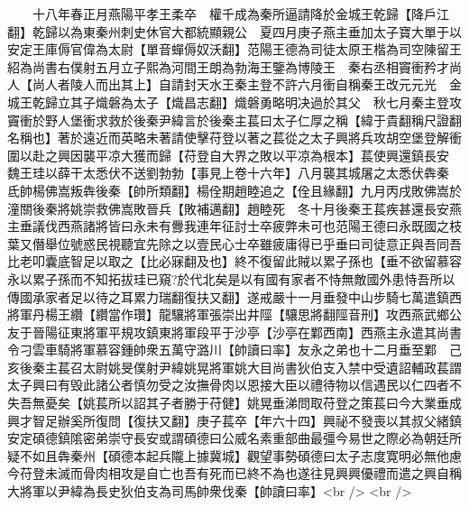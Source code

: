 　　十八年春正月燕陽平孝王柔卒　權千成為秦所逼請降於金城王乾歸【降戶江翻】乾歸以為東秦州刺史休官大都統顯親公　夏四月庚子燕主垂加太子寶大單于以安定王庫傉官偉為太尉【單音蟬傉奴沃翻】范陽王德為司徒太原王楷為司空陳留王紹為尚書右僕射五月立子熙為河間王朗為勃海王鑒為博陵王　秦右丞相竇衝矜才尚人【尚人者陵人而出其上】自請封天水王秦主登不許六月衝自稱秦王改元元光　金城王乾歸立其子熾磐為太子【熾昌志翻】熾磐勇略明决過於其父　秋七月秦主登攻竇衝於野人堡衝求救於後秦尹緯言於後秦主萇曰太子仁厚之稱【緯于貴翻稱尺證翻名稱也】著於遠近而英略未著請使擊苻登以著之萇從之太子興將兵攻胡空堡登解衝圍以赴之興因襲平凉大獲而歸【苻登自大界之敗以平凉為根本】萇使興還鎮長安　魏王珪以薛干太悉伏不送劉勃勃【事見上卷十六年】八月襲其城屠之太悉伏犇秦　氐帥楊佛嵩叛犇後秦【帥所類翻】楊佺期趙睦追之【佺且緣翻】九月丙戌敗佛嵩於潼關後秦將姚崇救佛嵩敗晉兵【敗補邁翻】趙睦死　冬十月後秦王萇疾甚還長安燕主垂議伐西燕諸將皆曰永未有釁我連年征討士卒疲弊未可也范陽王德曰永既國之枝葉又僭舉位號惑民視聽宜先除之以壹民心士卒雖疲庸得已乎垂曰司徒意正與吾同吾比老叩囊底智足以取之【比必寐翻及也】終不復留此賊以累子孫也【垂不欲留慕容永以累子孫而不知拓拔珪已窺?於代北矣是以有國有家者不恃無敵國外患恃吾所以傳國承家者足以待之耳累力瑞翻復扶又翻】遂戒嚴十一月垂發中山步騎七萬遣鎮西將軍丹楊王纘【纘當作瓚】龍驤將軍張崇出井陘【驤思將翻陘音刑】攻西燕武鄉公友于晉陽征東將軍平規攻鎮東將軍段平于沙亭【沙亭在鄴西南】西燕主永遣其尚書令刁雲車騎將軍慕容鍾帥衆五萬守潞川【帥讀曰率】友永之弟也十二月垂至鄴　己亥後秦主萇召太尉姚旻僕射尹緯姚晃將軍姚大目尚書狄伯支入禁中受遺詔輔政萇謂太子興曰有毁此諸公者慎勿受之汝撫骨肉以恩接大臣以禮待物以信遇民以仁四者不失吾無憂矣【姚萇所以詔其子者勝于苻健】姚晃垂涕問取苻登之策萇曰今大業垂成興才智足辦奚所復問【復扶又翻】庚子萇卒【年六十四】興祕不發喪以其叔父緒鎮安定碩德鎮隂密弟崇守長安或謂碩德曰公威名素重部曲最彊今易世之際必為朝廷所疑不如且犇秦州【碩德本起兵隴上據冀城】觀望事勢碩德曰太子志度寛明必無他慮今苻登未滅而骨肉相攻是自亡也吾有死而已終不為也遂往見興興優禮而遣之興自稱大將軍以尹緯為長史狄伯支為司馬帥衆伐秦【帥讀曰率】<br />
<br />
